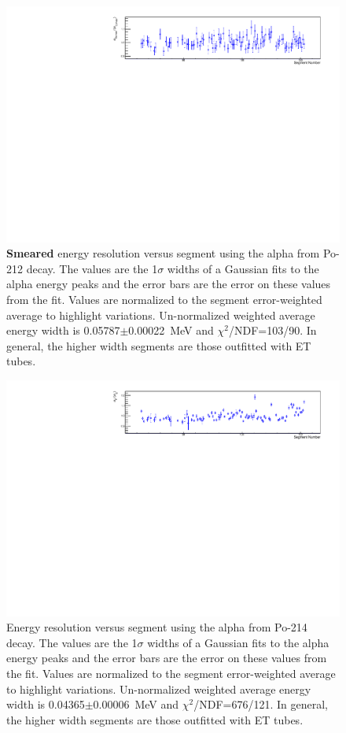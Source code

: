 \begin{figure}[!h]
\centering
\includegraphics[width=1.05\textwidth]{figures/PubBiPo212EsmearresvsCell.pdf}
\caption{\label{fig:EsmearresvsCell212}{\bf Smeared} energy resolution versus segment using the alpha from Po-212 decay. The values are the 1$\sigma$ widths of a Gaussian fits to the alpha energy peaks and the error bars are the error on these values from the fit. Values are normalized to the segment error-weighted average to highlight variations. Un-normalized weighted average energy width is 0.05787$\pm$0.00022~MeV and $\chi^2$/NDF=103/90.  In general, the higher width segments are those outfitted with ET tubes.}
\end{figure}
\begin{figure}[!h]
\centering
\includegraphics[width=1.05\textwidth]{figures/PubBiPo214EresvsCell.pdf}
\caption{\label{fig:EresvsCell214}Energy resolution versus segment using the alpha from Po-214 decay. The values are the 1$\sigma$ widths of a Gaussian fits to the alpha energy peaks and the error bars are the error on these values from the fit. Values are normalized to the segment error-weighted average to highlight variations. Un-normalized weighted average energy width is 0.04365$\pm$0.00006~MeV and $\chi^2$/NDF=676/121.  In general, the higher width segments are those outfitted with ET tubes.}
\end{figure}
